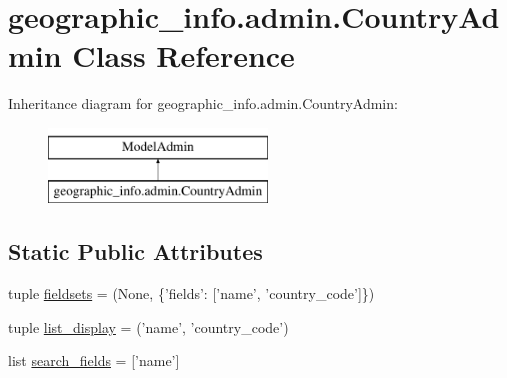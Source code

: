 \hypertarget{classgeographic__info_1_1admin_1_1_country_admin}{\section{geographic\-\_\-info.\-admin.\-Country\-Admin Class Reference}
\label{classgeographic__info_1_1admin_1_1_country_admin}
}
Inheritance diagram for geographic\-\_\-info.\-admin.\-Country\-Admin\-:\begin{figure}[H]
\begin{center}
\leavevmode
\includegraphics[height=2.000000cm]{classgeographic__info_1_1admin_1_1_country_admin}
\end{center}
\end{figure}
\subsection*{Static Public Attributes}
\begin{DoxyCompactItemize}
\item 
tuple \hyperlink{classgeographic__info_1_1admin_1_1_country_admin_a78833b00c76c00197750aecbe012014c}{fieldsets} = (None, \{'fields'\-: \mbox{[}'name', 'country\-\_\-code'\mbox{]}\})
\item 
tuple \hyperlink{classgeographic__info_1_1admin_1_1_country_admin_a17315e2e797d122568a5de87edbdd8d5}{list\-\_\-display} = ('name', 'country\-\_\-code')
\item 
list \hyperlink{classgeographic__info_1_1admin_1_1_country_admin_a8b13be9b97b65db8aedf41ec07d870e6}{search\-\_\-fields} = \mbox{[}'name'\mbox{]}
\end{DoxyCompactItemize}


